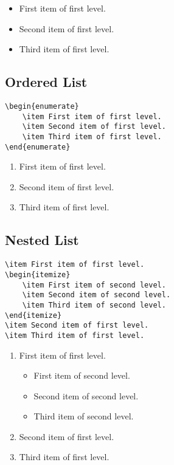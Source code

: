 \begin{itemize}
    \item First item of first level.
    \item Second item of first level.
    \item Third item of first level.
\end{itemize}

\subsection*{Ordered List}%
\label{subsec:ordered-list}

\begin{lstlisting}[caption={An ordered list.}]
\begin{enumerate}
    \item First item of first level.
    \item Second item of first level.
    \item Third item of first level.
\end{enumerate}
\end{lstlisting}

\begin{enumerate}
    \item First item of first level.
    \item Second item of first level.
    \item Third item of first level.
\end{enumerate}

\subsection*{Nested List}%
\label{subsec:nested-list}

\begin{lstlisting}[caption={A nested list.}]
\item First item of first level.
\begin{itemize}
    \item First item of second level.
    \item Second item of second level.
    \item Third item of second level.
\end{itemize}
\item Second item of first level.
\item Third item of first level.
\end{lstlisting}

\begin{enumerate}
    \item First item of first level.
    \begin{itemize}
        \item First item of second level.
        \item Second item of second level.
        \item Third item of second level.
    \end{itemize}
    \item Second item of first level.
    \item Third item of first level.
\end{enumerate}

